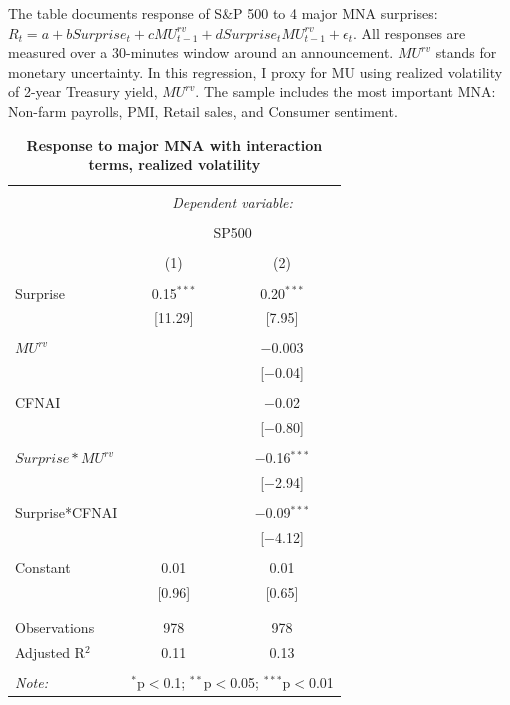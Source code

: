 \documentclass[12pt]{article}
\begin{document}
\begin{table}[!htbp] \centering 
  \caption{\textbf{Response to major MNA with interaction terms, realized volatility}} 
  \label{}
    \begin{flushleft}
    {\medskip\small
 The table documents response of S\&P 500 to 4 major MNA surprises: $R_t = a + b Surprise_t + c MU^{rv}_{t-1} + d Surprise_t MU^{rv}_{t-1} + \epsilon_t.$ All responses are measured over a 30-minutes window around an announcement. $MU^{rv}$ stands for monetary uncertainty. In this regression, I proxy for MU using realized volatility of 2-year Treasury yield, $MU^{rv}$. The sample includes the most important MNA: Non-farm payrolls, PMI, Retail sales, and Consumer sentiment.}
    \medskip
    \end{flushleft}
\begin{tabular}{@{\extracolsep{5pt}}lcc} 
\\[-1.8ex]\hline 
\hline \\[-1.8ex] 
 & \multicolumn{2}{c}{\textit{Dependent variable:}} \\ 
\cline{2-3} 
\\[-1.8ex] & \multicolumn{2}{c}{SP500} \\ 
\\[-1.8ex] & (1) & (2)\\ 
\hline \\[-1.8ex] 
 Surprise & 0.15$^{***}$ & 0.20$^{***}$ \\ 
  & [11.29] & [7.95] \\ 
  & & \\ 
 $MU^{rv}$ &  & $-$0.003 \\ 
  &  & [$-$0.04] \\ 
  & & \\ 
 CFNAI &  & $-$0.02 \\ 
  &  & [$-$0.80] \\ 
  & & \\ 
 $Surprise*MU^{rv}$ &  & $-$0.16$^{***}$ \\ 
  &  & [$-$2.94] \\ 
  & & \\ 
 Surprise*CFNAI &  & $-$0.09$^{***}$ \\ 
  &  & [$-$4.12] \\ 
  & & \\ 
 Constant & 0.01 & 0.01 \\ 
  & [0.96] & [0.65] \\ 
  & & \\ 
\hline \\[-1.8ex] 
Observations & 978 & 978 \\ 
Adjusted R$^{2}$ & 0.11 & 0.13 \\ 
\hline 
\hline \\[-1.8ex] 
\textit{Note:}  & \multicolumn{2}{r}{$^{*}$p$<$0.1; $^{**}$p$<$0.05; $^{***}$p$<$0.01} \\ 
\end{tabular} 
\end{table}
\end{document}
